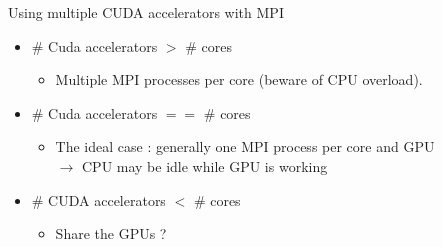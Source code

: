 \documentclass{beamer}
\newcounter{gp}
\begin{document}
\begin{frame}{Using multiple CUDA accelerators with MPI}

  \begin{itemize}
  \item 
    \begin{minipage}[t]{60mm}
      \# Cuda accelerators $>$ \# cores
      \begin{itemize}
      \item Multiple MPI processes per core (beware of CPU overload).
      \end{itemize}
    \end{minipage}
    \begin{minipage}{35mm}
    \end{minipage}
  \item 
    \begin{minipage}[t]{60mm}
      \# Cuda accelerators $==$ \# cores
      \begin{itemize}
      \item The ideal case : generally one MPI process per core and GPU \\
        $\rightarrow$ CPU may be idle while GPU is working        
      \end{itemize}
    \end{minipage}
    \begin{minipage}{35mm}
    \end{minipage}
  \item 
    \begin{minipage}[t]{60mm}
    \# CUDA accelerators $<$ \# cores
      \begin{itemize}
      \item Share the GPUs ?

\end{itemize}
\end{minipage}
\end{itemize}
\end{frame}
\end{document}
